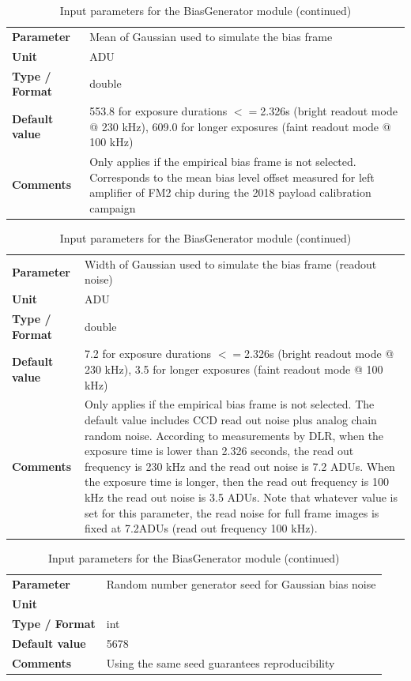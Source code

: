 \documentclass[11pt]{article}      %
\def\HCode#1{}
\def\htmlanchor#1{\HCode{<a id="#1"></a>}}
\begin{document}
\begin{table}[hb]
  \caption{Input parameters for the BiasGenerator module (continued)}

  \htmlanchor{biasMean}
  \begin{tabular}{| l | p{13cm} |}
    \hline 
    {\bf Parameter} & Mean of Gaussian used to simulate the bias frame\\
    {\bf Unit} & ADU\\
    {\bf Type / Format} & double\\
    {\bf Default value} & 553.8 for exposure durations $<=$2.326s (bright readout mode @ 230 kHz), 609.0 for longer exposures (faint readout mode @ 100 kHz)\\
    {\bf Comments} & Only applies if the empirical bias frame is not selected. Corresponds to the mean bias level offset measured for left amplifier of FM2 chip during the 2018 payload calibration campaign~\cite{payload_calibration}\\
    \hline
  \end{tabular}
  \bigskip

  \htmlanchor{biasWidth}
  \begin{tabular}{| l | p{13cm} |}
    \hline 
    {\bf Parameter} & Width of Gaussian used to simulate the bias frame (readout noise)\\
    {\bf Unit} & ADU\\
    {\bf Type / Format} & double\\
    {\bf Default value} & 7.2 for exposure durations $<=$2.326s (bright readout mode @ 230 kHz), 3.5 for longer exposures (faint readout mode @ 100 kHz)\\
    {\bf Comments} & Only applies if the empirical bias frame is not selected. The default value includes CCD read out noise plus analog chain random noise. According to measurements by DLR, when the exposure time is lower than 2.326 seconds, the read out frequency is 230 kHz and the read out noise is 7.2 ADUs. When the exposure time is longer, then the read out frequency is 100 kHz the read out noise is 3.5 ADUs. Note that whatever value is set for this parameter, the read noise for full frame images is fixed at 7.2ADUs (read out frequency 100 kHz).\\
    \hline
  \end{tabular}
  \bigskip

  \htmlanchor{biasNoiseSeed}
  \begin{tabular}{| l | p{13cm} |}
    \hline 
    {\bf Parameter} & Random number generator seed for Gaussian bias noise\\
    {\bf Unit} & \\
    {\bf Type / Format} & int\\
    {\bf Default value} & 5678\\
    {\bf Comments} & Using the same seed guarantees reproducibility\\
    \hline
  \end{tabular}
  \bigskip 


\end{table}
\end{document}
